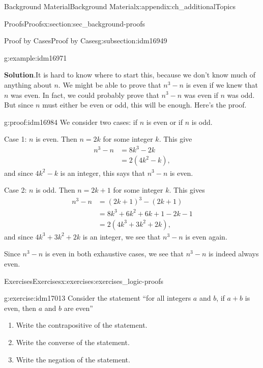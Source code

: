 \documentclass[oneside,10pt,]{book}
\numberwithin{equation}{chapter}
\newcommand{\amp}{&}
\begin{document}
\begin{appendixptx}{Background Material}{}{Background Material}{}{}{x:appendix:ch_additionalTopics}
\begin{sectionptx}{Proofs}{}{Proofs}{}{}{x:section:sec_background-proofs}
\begin{subsectionptx}{Proof by Cases}{}{Proof by Cases}{}{}{g:subsection:idm16949}
\begin{example}{}{g:example:idm16971}
\par\smallskip%
\noindent\textbf{Solution}.\hypertarget{g:solution:idm16976}{}\quad{}It is hard to know where to start this, because we don't know much of anything about \(n\). We might be able to prove that \(n^3 - n\) is even if we knew that \(n\) was even. In fact, we could probably prove that \(n^3-n\) was even if \(n\) was odd. But since \(n\) must either be even or odd, this will be enough. Here's the proof.%
\begin{proofptx}{}{g:proof:idm16984}
We consider two cases: if \(n\) is even or if \(n\) is odd.%
\par
Case 1: \(n\) is even. Then \(n = 2k\) for some integer \(k\). This give%
\begin{align*}
n^3 - n \amp = 8k^3 - 2k\\
\amp = 2(4k^2 - k),
\end{align*}
and since \(4k^2 - k\) is an integer, this says that \(n^3-n\) is even.%
\par
Case 2: \(n\) is odd. Then \(n = 2k+1\) for some integer \(k\). This gives%
\begin{align*}
n^3 - n \amp = (2k+1)^3 - (2k+1)\\
\amp = 8k^3 + 6k^2 + 6k + 1 - 2k - 1\\
\amp = 2(4k^3 + 3k^2 + 2k),
\end{align*}
and since \(4k^3 + 3k^2 + 2k\) is an integer, we see that \(n^3 - n\) is even again.%
\par
Since \(n^3 - n\) is even in both exhaustive cases, we see that \(n^3 - n\) is indeed always even.%
\end{proofptx}
\end{example}
\end{subsectionptx}
%
%
\typeout{************************************************}
\typeout{************************************************}
%
\begin{exercises-subsection}{Exercises}{}{Exercises}{}{}{x:exercises:exercises_logic-proofs}
\begin{divisionexercise}{1}{}{}{g:exercise:idm17013}%
Consider the statement ``for all integers \(a\) and \(b\), if \(a + b\) is even, then \(a\) and \(b\) are even''%
\par
%
\begin{enumerate}[label=(\alph*)]
\item{}Write the contrapositive of the statement.%
\item{}Write the converse of the statement.%
\item{}Write the negation of the statement.%

\end{enumerate}
\end{divisionexercise}
\end{exercises-subsection}
\end{sectionptx}
\end{appendixptx}
\end{document}
